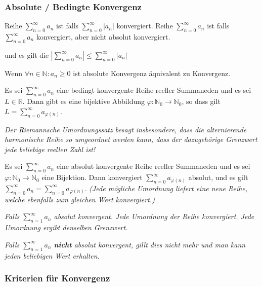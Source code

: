\subsubsection{Absolute / Bedingte Konvergenz}

Reihe $\sum_{n=0}^{\infty} a_n$ ist  falls $\sum_{n=0}^{\infty} |a_n|$ konvergiert.
Reihe $\sum_{n=0}^{\infty} a_n$ ist  falls $\sum_{n=0}^{\infty} a_n$ konvergiert, aber nicht absolut konvergiert.

 und es gilt die  $|\sum_{n=0}^{\infty} a_n | \leq \sum_{n=0}^{\infty} |a_n|$

\begin{exercise}
    Wenn $\forall n \in \mathbb{N}: a_n \geq 0$ ist absolute Konvergenz äquivalent zu Konvergenz.
\end{exercise}

 Es sei $\sum_{n=0}^{\infty} a_n$ eine bedingt konvergente Reihe reeller Summaneden und es sei $L \in \mathbb{R}$. Dann gibt es eine bijektive Abbildung $\varphi : \mathbb{N}_0 \rightarrow \mathbb{N}_0$, so dass gilt $L= \sum_{n=0}^{\infty} a_{\varphi(n)}$.

\textit{Der Riemannsche Umordnungssatz besagt insbesondere, dass die alternierende harmonische Reihe
so umgeordnet werden kann, dass der dazugehörige Grenzwert jede beliebige reellen Zahl ist!}

 Es sei $\sum_{n=0}^{\infty} a_n$ eine absolut konvergente Reihe reeller Summaneden und es sei $\varphi : \mathbb{N}_0 \rightarrow \mathbb{N}_0$ eine Bijektion. Dann konvergiert $\sum_{n=0}^{\infty} a_{\varphi (n)}$ absolut, und es gilt $\sum_{n=0}^{\infty} a_n = \sum_{n=0}^{\infty}a_{\varphi (n)}$. \textit{(Jede mögliche Umordnung liefert eine neue Reihe, welche ebenfalls zum gleichen Wert konvergiert.)}

\textit{Falls $\sum_{n=1}^{\infty}a_n$ absolut konvergent. Jede Umordnung der Reihe konvergiert. Jede Umordnung ergibt denselben Grenzwert.}

\textit{Falls $\sum_{n=1}^{\infty}a_n$ \textbf{nicht} absolut konvergent, gillt dies nicht mehr und man kann jeden beliebigen Wert erhalten.}

\subsubsection{Kriterien für Konvergenz}

